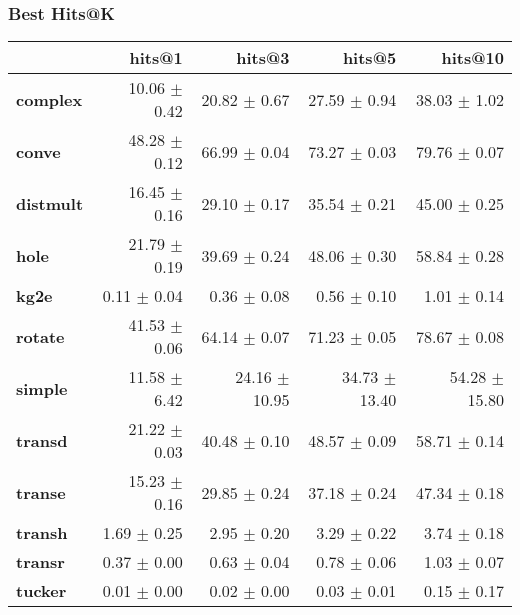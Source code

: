 \documentclass{article}
\begin{document}
    \subsubsection{Best Hits@K}
    \begin{center}
    \begin{tabular}{lrrrr}
\toprule
{} &        hits@1 &         hits@3 &         hits@5 &        hits@10 \\
\midrule
\textbf{complex } &  10.06 $\pm$ 0.42 &   20.82 $\pm$ 0.67 &   27.59 $\pm$ 0.94 &   38.03 $\pm$ 1.02 \\
\textbf{conve   } &  48.28 $\pm$ 0.12 &   66.99 $\pm$ 0.04 &   73.27 $\pm$ 0.03 &   79.76 $\pm$ 0.07 \\
\textbf{distmult} &  16.45 $\pm$ 0.16 &   29.10 $\pm$ 0.17 &   35.54 $\pm$ 0.21 &   45.00 $\pm$ 0.25 \\
\textbf{hole    } &  21.79 $\pm$ 0.19 &   39.69 $\pm$ 0.24 &   48.06 $\pm$ 0.30 &   58.84 $\pm$ 0.28 \\
\textbf{kg2e    } &   0.11 $\pm$ 0.04 &    0.36 $\pm$ 0.08 &    0.56 $\pm$ 0.10 &    1.01 $\pm$ 0.14 \\
\textbf{rotate  } &  41.53 $\pm$ 0.06 &   64.14 $\pm$ 0.07 &   71.23 $\pm$ 0.05 &   78.67 $\pm$ 0.08 \\
\textbf{simple  } &  11.58 $\pm$ 6.42 &  24.16 $\pm$ 10.95 &  34.73 $\pm$ 13.40 &  54.28 $\pm$ 15.80 \\
\textbf{transd  } &  21.22 $\pm$ 0.03 &   40.48 $\pm$ 0.10 &   48.57 $\pm$ 0.09 &   58.71 $\pm$ 0.14 \\
\textbf{transe  } &  15.23 $\pm$ 0.16 &   29.85 $\pm$ 0.24 &   37.18 $\pm$ 0.24 &   47.34 $\pm$ 0.18 \\
\textbf{transh  } &   1.69 $\pm$ 0.25 &    2.95 $\pm$ 0.20 &    3.29 $\pm$ 0.22 &    3.74 $\pm$ 0.18 \\
\textbf{transr  } &   0.37 $\pm$ 0.00 &    0.63 $\pm$ 0.04 &    0.78 $\pm$ 0.06 &    1.03 $\pm$ 0.07 \\
\textbf{tucker  } &   0.01 $\pm$ 0.00 &    0.02 $\pm$ 0.00 &    0.03 $\pm$ 0.01 &    0.15 $\pm$ 0.17 \\
\bottomrule
\end{tabular}

    \end{center}
\end{document}
